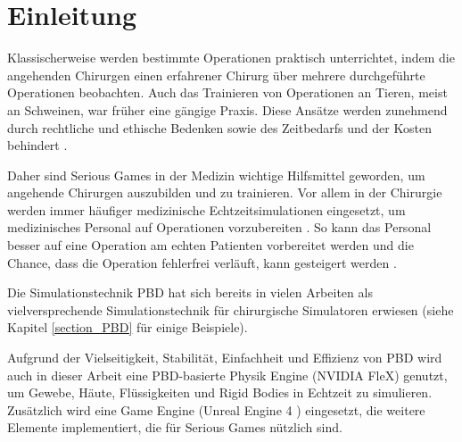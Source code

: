 \chapter{Einleitung}
\label{Motivation und Problemstellung}



Klassischerweise werden bestimmte Operationen praktisch unterrichtet, indem die angehenden  Chirurgen einen erfahrener Chirurg über mehrere durchgeführte \linebreak Operationen beobachten.
Auch das Trainieren von Operationen an Tieren, meist an Schweinen, war früher eine gängige Praxis. Diese Ansätze werden zunehmend durch rechtliche und ethische Bedenken sowie des Zeitbedarfs und der Kosten behindert \cite{SurgSim}.

Daher sind Serious Games in der Medizin wichtige Hilfsmittel geworden, um 
angehende Chirurgen  %
auszubilden und zu trainieren. Vor allem in der Chirurgie werden immer häufiger medizinische Echtzeitsimulationen eingesetzt, um medizinisches Personal auf Operationen vorzubereiten \cite{SimRole}. So kann das Personal besser auf eine Operation am echten Patienten vorbereitet werden und die Chance, dass die Operation fehlerfrei verläuft, kann gesteigert werden \cite{VRNeuro}.

Die Simulationstechnik \ac{PBD} \cite{PBD} hat sich bereits in vielen Arbeiten als vielversprechende Simulationstechnik für chirurgische Simulatoren erwiesen (siehe Kapitel \ref{section_PBD} für einige Beispiele). 

Aufgrund der Vielseitigkeit, Stabilität, Einfachheit und Effizienz von PBD wird auch in dieser Arbeit eine PBD-basierte Physik Engine (NVIDIA FleX) genutzt, um Gewebe, Häute, Flüssigkeiten und Rigid Bodies in Echtzeit zu simulieren. Zusätzlich wird eine Game Engine (Unreal Engine 4 \cite{UE4FlexDoc}) eingesetzt, die weitere Elemente implementiert, die für Serious Games nützlich sind. 


